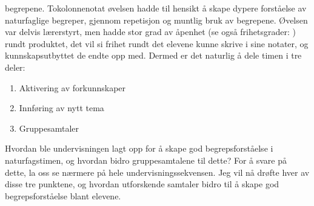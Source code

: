\documentclass[main.tex]{subfiles}
\begin{document}
begrepene. Tokolonnenotat øvelsen hadde til hensikt å skape dypere forståelse av naturfaglige begreper, 
gjennom repetisjon og muntlig bruk av begrepene. Øvelsen var delvis lærerstyrt, men hadde stor grad 
av åpenhet (se også frihetsgrader: ) rundt produktet, det vil si frihet rundt det 
elevene kunne skrive i sine notater, og kunnskapsutbyttet de endte opp med.
\newline
\newline
Dermed er det naturlig å dele timen i tre deler:
\begin{enumerate}
\item Aktivering av forkunnskaper  
\item Innføring av nytt tema
\item Gruppesamtaler
\end{enumerate}
Hvordan ble undervisningen lagt opp for å skape god begrepsforståelse i naturfagstimen, 
og hvordan bidro gruppesamtalene til dette? For å svare på dette, la oss se nærmere på hele 
undervisningssekvensen. Jeg vil nå drøfte hver av disse tre punktene, og hvordan utforskende
samtaler bidro til å skape god begrepsforståelse blant elevene.
\end{document}
